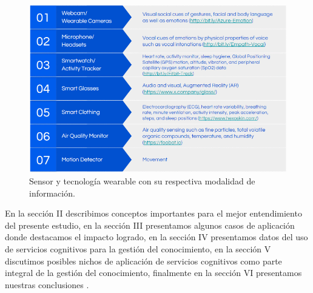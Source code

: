 \begin{figure}[htbp]
\centerline{\includegraphics[width = 0.5 \textwidth]{fig01.png}}
\caption{Sensor y tecnología wearable con su respectiva modalidad de información.}
\label{fig1}
\end{figure}

En la sección II describimos conceptos importantes para el mejor entendimiento del presente estudio, en la sección III presentamos algunos casos de aplicación donde destacamos el impacto logrado, en la sección IV presentamos datos del uso de servicios cognitivos para la gestión del conocimiento, en la sección V discutimos posibles nichos de aplicación de servicios cognitivos como parte integral de la gestión del conocimiento, finalmente en la sección VI presentamos nuestras conclusiones \cite{Ogiela2018}.